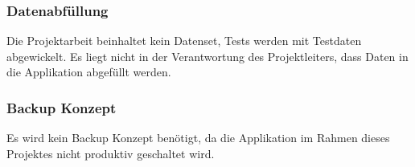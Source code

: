 \subsubsection{Datenabfüllung}\label{datenabfuxfcllung}

Die Projektarbeit beinhaltet kein Datenset, Tests werden mit Testdaten
abgewickelt. Es liegt nicht in der Verantwortung des Projektleiters,
dass Daten in die Applikation abgefüllt werden.

\subsubsection{Backup Konzept}\label{backup-konzept}

Es wird kein Backup Konzept benötigt, da die Applikation im Rahmen
dieses Projektes nicht produktiv geschaltet wird.
